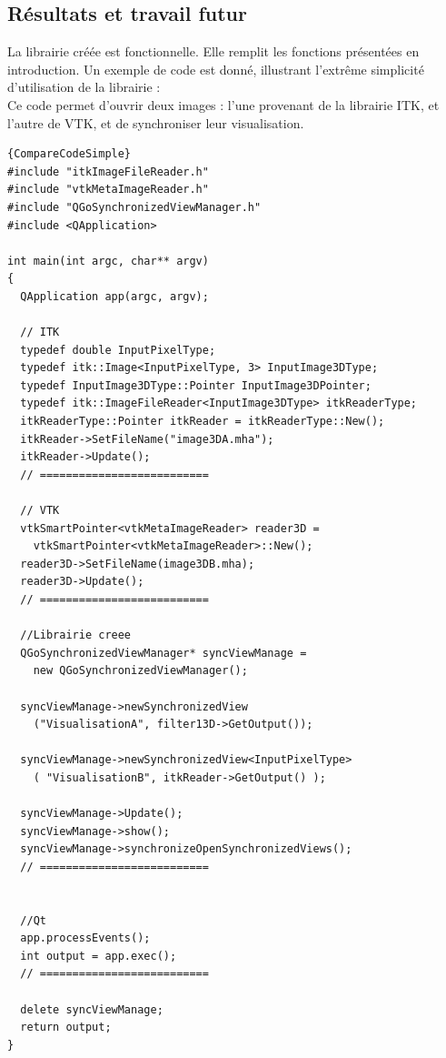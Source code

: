 \subsection{Résultats et travail futur}

La librairie créée est fonctionnelle. Elle remplit les fonctions présentées en introduction. Un exemple de code est donné, illustrant l'extrême simplicité d'utilisation de la librairie :\\
Ce code permet d'ouvrir deux images : l'une provenant de la librairie ITK, et l'autre de VTK, et de synchroniser leur visualisation.
\large
  \begin{lstlisting}[title={Utilisation simple de la librairie de comparaison d'images}, label=SimpleCodeCompare]{CompareCodeSimple}
#include "itkImageFileReader.h"
#include "vtkMetaImageReader.h"
#include "QGoSynchronizedViewManager.h"
#include <QApplication>

int main(int argc, char** argv)
{
  QApplication app(argc, argv);

  // ITK
  typedef double InputPixelType;
  typedef itk::Image<InputPixelType, 3> InputImage3DType;
  typedef InputImage3DType::Pointer InputImage3DPointer;
  typedef itk::ImageFileReader<InputImage3DType> itkReaderType;
  itkReaderType::Pointer itkReader = itkReaderType::New();
  itkReader->SetFileName("image3DA.mha");
  itkReader->Update();
  // ==========================

  // VTK
  vtkSmartPointer<vtkMetaImageReader> reader3D = 
    vtkSmartPointer<vtkMetaImageReader>::New();
  reader3D->SetFileName(image3DB.mha);
  reader3D->Update();
  // ==========================

  //Librairie creee
  QGoSynchronizedViewManager* syncViewManage =
    new QGoSynchronizedViewManager();

  syncViewManage->newSynchronizedView
    ("VisualisationA", filter13D->GetOutput());

  syncViewManage->newSynchronizedView<InputPixelType>
    ( "VisualisationB", itkReader->GetOutput() );
    
  syncViewManage->Update();
  syncViewManage->show();
  syncViewManage->synchronizeOpenSynchronizedViews();
  // ==========================


  //Qt
  app.processEvents();
  int output = app.exec();
  // ==========================
  
  delete syncViewManage;
  return output;
}
  \end{lstlisting}
\normalsize

